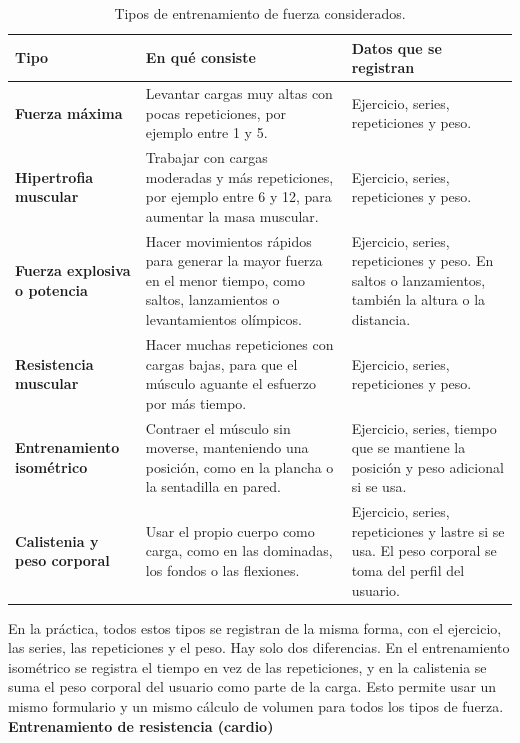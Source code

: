 \begin{table}[h!]
    \centering
    \renewcommand{\arraystretch}{1.4}
    \begin{tabular}{|m{3.5cm}|m{6cm}|m{5cm}|}
        \hline
        \rowcolor[HTML]{EFEFEF}
        \textbf{Tipo} & \textbf{En qué consiste} & \textbf{Datos que se registran} \\ \hline
        \textbf{Fuerza máxima} & Levantar cargas muy altas con pocas repeticiones, por ejemplo entre 1 y 5. & Ejercicio, series, repeticiones y peso. \\ \hline
        \textbf{Hipertrofia muscular} & Trabajar con cargas moderadas y más repeticiones, por ejemplo entre 6 y 12, para aumentar la masa muscular. & Ejercicio, series, repeticiones y peso. \\ \hline
        \textbf{Fuerza explosiva o potencia} & Hacer movimientos rápidos para generar la mayor fuerza en el menor tiempo, como saltos, lanzamientos o levantamientos olímpicos. & Ejercicio, series, repeticiones y peso. En saltos o lanzamientos, también la altura o la distancia. \\ \hline
        \textbf{Resistencia muscular} & Hacer muchas repeticiones con cargas bajas, para que el músculo aguante el esfuerzo por más tiempo. & Ejercicio, series, repeticiones y peso. \\ \hline
        \textbf{Entrenamiento isométrico} & Contraer el músculo sin moverse, manteniendo una posición, como en la plancha o la sentadilla en pared. & Ejercicio, series, tiempo que se mantiene la posición y peso adicional si se usa. \\ \hline
        \textbf{Calistenia y peso corporal} & Usar el propio cuerpo como carga, como en las dominadas, los fondos o las flexiones. & Ejercicio, series, repeticiones y lastre si se usa. El peso corporal se toma del perfil del usuario. \\ \hline
    \end{tabular}
    \caption{Tipos de entrenamiento de fuerza considerados.}
    \label{tab:tipos_fuerza}
\end{table}

En la práctica, todos estos tipos se registran de la misma forma, con el ejercicio, las series, las repeticiones y el peso. Hay solo dos diferencias. En el entrenamiento isométrico se registra el tiempo en vez de las repeticiones, y en la calistenia se suma el peso corporal del usuario como parte de la carga. Esto permite usar un mismo formulario y un mismo cálculo de volumen para todos los tipos de fuerza.
\newpage
\textbf{Entrenamiento de resistencia (cardio)}


